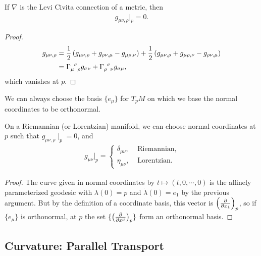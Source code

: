 \begin{claim}
    If $\nabla$ is the Levi Civita connection of a metric, then
\begin{align}
    g_{\mu \nu,\rho}\bigg|_{p} = 0
.\end{align}
\end{claim}

\begin{proof}
    \begin{align}
        g_{\mu \nu, \rho} &= \frac{1}{2} \left( g_{\mu \nu,\rho} +g_{\rho \nu, \mu} - g_{\mu \rho , \nu} \right) + \frac{1}{2} \left( g_{\mu \nu , \rho} + g_{\mu \rho , \nu} - g_{\rho \nu, \mu} \right)  \\
        &= \tensor{\Gamma}{_{\mu}^{\sigma}_{\rho}} g_{\sigma \nu} + \tensor{\Gamma}{_{\rho}^{\sigma}_{\nu}} g_{\sigma \mu}
    ,\end{align}
    which vanishes at $p$.
\end{proof}

We can always choose the basis $\{e_{\mu}\} $ for $T_{p} M$ on which we base the normal coordinates to be orthonormal.

\begin{lemma}
    On a Riemannian (or Lorentzian) manifold, we can choose normal coordinates at $p$ such that $g_{\mu \nu, \rho}  \mid _{p} = 0$, and
    \begin{align}
        g_{\mu \nu} \bigg|_{p} = \begin{cases}
            \delta_{\mu \nu}, & \text{~Riemannian,} \\
            \eta_{\mu \nu}, & \text{~Lorentzian.}
        \end{cases}
    \end{align}
\end{lemma}

\begin{proof}
    The curve given in normal coordinates by $t \mapsto \left( t,0,\cdots,0  \right) $ is the affinely parameterized geodesic with $\lambda \left( 0 \right) = p$ and $\dot{\lambda}\left( 0 \right) = e_1$ by the previous argument. But by the definition of a coordinate basis, this vector is $\left( \pdv{x_1} \right)_{p}$, so if $\{e_{\mu}\} $ is orthonormal, at $p$ the set $\{ \left( \pdv{x^{\mu}} \right)_{p} \} $ form an orthonormal basis.
\end{proof}

\subsection{Curvature: Parallel Transport}

